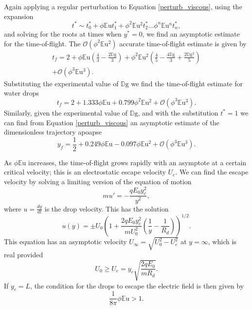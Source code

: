 \documentclass[aip,reprint, floatfix]{revtex4-1}
\begin{document}
Again applying a regular perturbation to Equation \ref{perturb_viscous}, using the expansion
\[ t^* \sim t^*_0 + \phi \mathbb{E}\mbox{u} t^*_1 + \phi^2 \mathbb{E}\mbox{u}^2 t^*_2 \ldots \phi^n \mathbb{E}\mbox{u}^n t^*_n  
,\]
and solving for the roots at times when $y^* = 0$, we find an asymptotic estimate for the time-of-flight. The $\mathcal{O}(\phi^2 \mathbb{E}\mbox{u}^2)$ accurate time-of-flight estimate is given by
\begin{gather*}
t_f = 2 + \phi \mathbb{E}\mbox{u} \left(\frac{4}{3} - \frac{2 \mathbb{D}\mbox{g}}{3}\right) 
+ \phi^2 \mathbb{E}\mbox{u}^{2} \left(\frac{4}{5} - \frac{4 \mathbb{D}\mbox{g}}{3} + \frac{2 \mathbb{D}\mbox{g}^{2}}{5}\right) \\
+ \mathcal{O}(\phi^3 \mathbb{E}\mbox{u}^3).
\end{gather*}
Substituting the experimental value of $\mathbb{D}\mbox{g}$ we find the time-of-flight estimate for water drops
\begin{equation} \label{time_of_flight}
t_f = 2 + 1.333 \phi \mathbb{E}\mbox{u} + 0.799 \phi^2 \mathbb{E}\mbox{u}^{2} + \mathcal{O}(\phi^3 \mathbb{E}\mbox{u}^3). 
\end{equation} 
Similarly, given the experimental value of $\mathbb{D}\mbox{g}$, and with the substitution $t^*=1$ we can find from Equation \ref{perturb_viscous} an asymptotic estimate of the dimensionless trajectory apoapse
\begin{equation} \label{dimless_apoapse}
y_f = \frac{1}{2} + 0.249 \phi \mathbb{E}\mbox{u} - 0.097 \phi \mathbb{E}\mbox{u}^{2} + \mathcal{O}(\phi^3 \mathbb{E}\mbox{u}^3).
\end{equation}

As $\phi \mathbb{E}\mbox{u}$ increases, the time-of-flight grows rapidly with an asymptote at a certain critical velocity; this is an electrostatic escape velocity $U_e$. We can find the escape velocity by solving a limiting version of the equation of motion
\[ m u' = - \frac{q E_0 y_c^2}{y^2}, \]
where $u = \frac{d y}{d t}$ is the drop velocity. This has the solution
\[ u(y) = \pm U_0 \left(1 + \frac{2q E_0 y_c^2}{m U_0^2} \left( \frac{1}{y} - \frac{1}{R_d} \right) \right)^{1/2}.
\]
This equation has an asymptotic velocity $U_{\infty} = \sqrt{U_0^2 - U_e^2}$ at $y = \infty$, which is real provided 
\[ U_0 \geq  U_e = y_c \sqrt{\frac{2 q E_0 }{m R_d}}.
\]
If $y_c=L$, the condition for the drops to escape the electric field is then given by
\begin{equation}\label{escape}
\frac{1}{8 \pi} \phi \mathbb{E}\mbox{u} > 1.
\end{equation}
\end{document}
